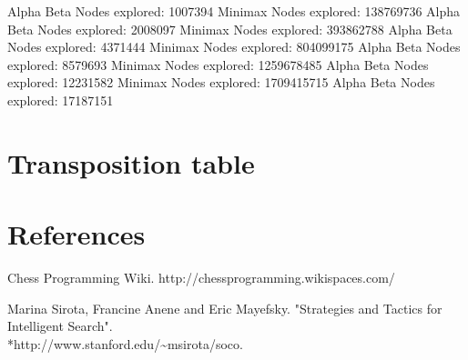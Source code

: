 \documentclass{article}
\begin{document}
Alpha Beta Nodes explored: 1007394
Minimax Nodes explored: 138769736
Alpha Beta Nodes explored: 2008097
Minimax Nodes explored: 393862788
Alpha Beta Nodes explored: 4371444
Minimax Nodes explored: 804099175
Alpha Beta Nodes explored: 8579693
Minimax Nodes explored: 1259678485
Alpha Beta Nodes explored: 12231582
Minimax Nodes explored: 1709415715
Alpha Beta Nodes explored: 17187151

\section{Transposition table}


\section{References}

Chess Programming Wiki. http://chessprogramming.wikispaces.com/

Marina Sirota, Francine Anene and Eric Mayefsky. "Strategies and Tactics for Intelligent Search". \\*http://www.stanford.edu/\textasciitilde msirota/soco.
\end{document}
